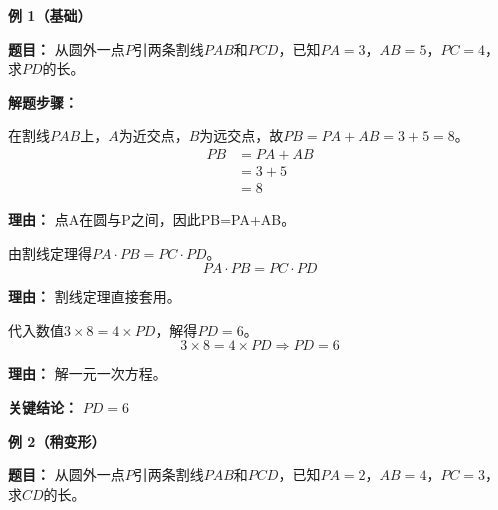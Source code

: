 \begin{examplebox}
	\textbf{\textcolor{CExample}{例 1（基础）}}

	\textbf{\textcolor{CExample}{题目：}}
	从圆外一点$P$引两条割线$PAB$和$PCD$，已知$PA=3$，$AB=5$，$PC=4$，求$PD$的长。

	\textbf{\textcolor{CExample}{解题步骤：}}
	\begin{description}[style=nextline, leftmargin=2.8em, labelsep=0.5em, itemsep=0.45em]
		\item[\textbf{第一步（明确线段）：}] 在割线$PAB$上，$A$为近交点，$B$为远交点，故$PB=PA+AB=3+5=8$。
			\[
				\begin{aligned}
					PB &= PA+AB \\
					&= 3+5 \\
					&= 8
			\end{aligned}
			\]
			\par\textbf{理由：} 点A在圆与P之间，因此PB=PA+AB。
		\item[\textbf{第二步（套用定理）：}] 由割线定理得$PA\cdot PB = PC\cdot PD$。
			\[
				PA\cdot PB = PC\cdot PD
			\]
			\par\textbf{理由：} 割线定理直接套用。
		\item[\textbf{第三步（代值求解）：}] 代入数值$3\times 8 = 4\times PD$，解得$PD=6$。
			\[
				3\times 8 = 4\times PD \Rightarrow PD = 6
			\]
			\par\textbf{理由：} 解一元一次方程。
	\end{description}

	\textbf{\textcolor{CExample}{关键结论：}}
	\textbf{$PD=6$}

	\medskip
	\textbf{\textcolor{CExample}{例 2（稍变形）}}

	\textbf{\textcolor{CExample}{题目：}}
	从圆外一点$P$引两条割线$PAB$和$PCD$，已知$PA=2$，$AB=4$，$PC=3$，求$CD$的长。


\end{examplebox}
